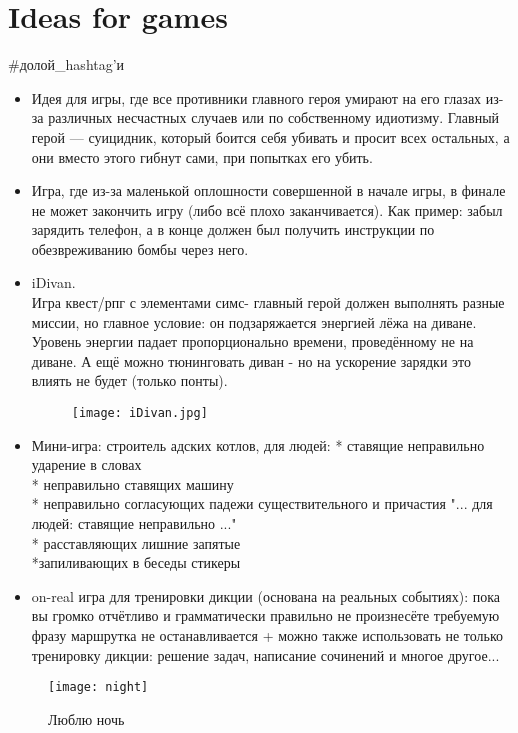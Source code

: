 \section{Ideas for games}
\begin{epigraph}
    \#долой\_hashtag'и
\end{epigraph}

\begin{itemize}
\item Идея для игры, где все противники главного героя умирают на его глазах из-за различных несчастных случаев или по собственному идиотизму.
Главный герой --- суицидник, который боится себя убивать и просит всех остальных, а они вместо этого гибнут сами, при попытках его убить.
\item Игра, где из-за маленькой оплошности совершенной в начале игры, в финале не может закончить игру (либо всё плохо заканчивается).
Как пример: забыл зарядить телефон, а в конце должен был получить инструкции по обезвреживанию бомбы через него.
\item iDivan.\\
Игра квест/рпг с элементами симс- главный герой должен выполнять разные миссии, но главное условие: он подзаряжается энергией лёжа на диване.
Уровень энергии падает пропорционально времени, проведённому не на диване. А ещё можно тюнинговать диван - но на ускорение зарядки это влиять
не будет (только понты).

\begin{figure}[ht!]
    \center
    \texttt{[image: iDivan.jpg]}
\end{figure}

\item Мини-игра: строитель адских котлов, для людей:
* ставящие неправильно ударение в словах\\
* неправильно ставящих машину\\
* неправильно согласующих падежи существительного и причастия "... для людей: ставящие неправильно ..."\\
* расставляющих лишние запятые\\
*запиливающих в беседы стикеры
\item on-real игра для тренировки дикции (основана на реальных событиях): пока вы громко отчётливо и грамматически правильно не произнесёте
требуемую фразу маршрутка не останавливается + можно также использовать не только тренировку дикции: решение задач, написание сочинений
и многое другое...
\end{itemize}
\begin{figure}[ht!]
    \centering
    \texttt{[image: night]}
    \caption{Люблю ночь}
\end{figure}
